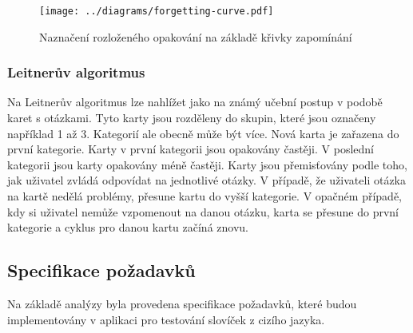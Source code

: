 \documentclass[a4paper,11pt,titlepage,fleqn]{article}
\begin{document}
            \begin{figure}[ht!]
                \centering
                \texttt{[image: ../diagrams/forgetting-curve.pdf]}
                \caption{Naznačení rozloženého opakování na základě křivky zapomínání}
                \label{fig:forgetting-curve}
            \end{figure}
         
        \subsubsection{Leitnerův algoritmus}
            \label{leitner}
            Na Leitnerův algoritmus lze nahlížet jako na známý učební postup v podobě karet s otázkami. Tyto karty jsou rozděleny do skupin, které jsou označeny například 1 až 3. Kategorií ale obecně může být více. Nová karta je zařazena do první kategorie. Karty v první kategorii jsou opakovány častěji. V poslední kategorii jsou karty opakovány méně častěji. Karty jsou přemisťovány podle toho, jak uživatel zvládá odpovídat na jednotlivé otázky. V případě, že uživateli otázka na kartě nedělá problémy, přesune kartu do vyšší kategorie. V opačném případě, kdy si uživatel nemůže vzpomenout na danou otázku, karta se přesune do první kategorie a cyklus pro danou kartu začíná znovu.

    \subsection{Specifikace požadavků}
        Na základě analýzy byla provedena specifikace požadavků, které budou implementovány v aplikaci pro testování slovíček z cizího jazyka.
\end{document}
